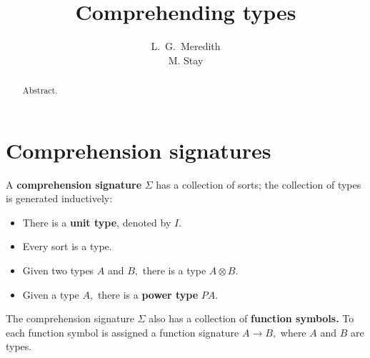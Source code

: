 \documentclass{article}
\begin{document}
\title{Comprehending types}
\author{L.\ G.\ Meredith \\ M. Stay}

\maketitle

\begin{abstract}
Abstract.
\end{abstract}

\section{Comprehension signatures}
A {\bf comprehension signature} $\Sigma$ has a collection of sorts; the collection of types is generated inductively:
\begin{itemize}
  \item There is a {\bf unit type}, denoted by $I.$
  \item Every sort is a type.
  \item Given two types $A$ and $B,$ there is a type $A\otimes B.$
  \item Given a type $A,$ there is a {\bf power type} $PA.$
\end{itemize}

The comprehension signature $\Sigma$ also has a collection of {\bf function symbols.}  To each function symbol is assigned a function signature $A\to B,$ where $A$ and $B$ are types.
\end{document}
